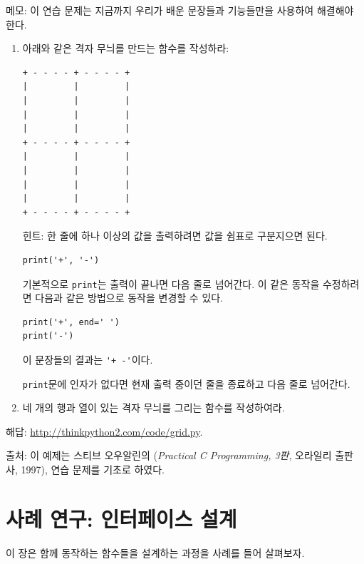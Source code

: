 \documentclass[10pt]{book}
\begin{document}
\begin{exercise}

  메모: 이 연습 문제는 지금까지 우리가 배운 문장들과 기능들만을
  사용하여 해결해야 한다.

\begin{enumerate}

\item 아래와 같은 격자 무늬를 만드는 함수를 작성하라:

\begin{verbatim}
+ - - - - + - - - - +
|         |         |
|         |         |
|         |         |
|         |         |
+ - - - - + - - - - +
|         |         |
|         |         |
|         |         |
|         |         |
+ - - - - + - - - - +
\end{verbatim}
%
힌트: 한 줄에 하나 이상의 값을 출력하려면 값을 쉼표로 구분지으면 된다. 

\begin{verbatim}
print('+', '-')
\end{verbatim}
%
기본적으로 {\tt print}는 출력이 끝나면 다음 줄로 넘어간다.  이 같은
동작을 수정하려면 다음과 같은 방법으로 동작을 변경할 수 있다.

\begin{verbatim}
print('+', end=' ')
print('-')
\end{verbatim}
%
이 문장들의 결과는 \verb"'+ -'"이다. 

{\tt print}문에 인자가 없다면 현재 출력 중이던 줄을 종료하고 다음
줄로 넘어간다.

\item 네 개의 행과 열이 있는 격자 무늬를 그리는 함수를 작성하여라. 

\end{enumerate}

해답: \url{http://thinkpython2.com/code/grid.py}.  

출처: 이 예제는 스티브 오우알린의 ({\em Practical C Programming, 3판},
오라일리 출판사, 1997), 연습 문제를 기초로 하였다.

\end{exercise}





\chapter{사례 연구: 인터페이스 설계}
\label{turtlechap}

이 장은 함께 동작하는 함수들을 설계하는 과정을 사례를 들어 살펴보자. 
\end{document}
